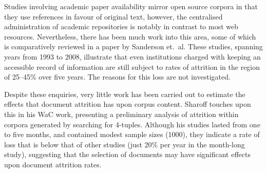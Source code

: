 

Studies involving academic paper availability mirror open source corpora in that they use references in favour of original text, however, the centralised administration of academic repositories is notably in contrast to most web resources.  Nevertheless, there has been much work into this area, some of which is comparatively reviewed in a paper by Sanderson et.\ al.\cite{sanderson2011analyzing}  These studies, spanning years from 1993 to 2008, illustrate that even institutions charged with keeping an accessible record of information are still subject to rates of attrition in the region of 25--45\% over five years.  The reasons for this loss are not investigated.



Despite these enquiries, very little work has been carried out to estimate the effects that document attrition has upon corpus content.  %
Sharoff\cite{sharoff2006creating} touches upon this in his WaC work, presenting a preliminary analysis of attrition within corpora generated by searching for 4-tuples.  Although his studies lasted from one to five months, and contained modest sample sizes (1000), they indicate a rate of loss that is below that of other studies (just 20\% per year in the month-long study), suggesting that the selection of documents may have significant effects upon document attrition rates.




